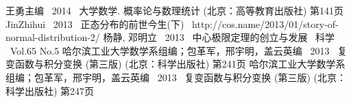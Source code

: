\documentclass[a4paper]{ctexart}
\begin{document}
\bigskip
\begin{thebibliography}{999}%

 王勇主编 \ 2014 \ 大学数学. 概率论与数理统计 (北京：高等教育出版社) 第141页
 JinZhihui \ 2013 \ 正态分布的前世今生(下) \ http://cos.name/2013/01/story-of-normal-distribution-2/
 杨静, 邓明立 \ 2013 \ 中心极限定理的创立与发展 \ 科学 \ Vol.65 No.5
 哈尔滨工业大学数学系组编；包革军，邢宇明，盖云英编 \ 2013 \ 复变函数与积分变换 (第三版) (北京：科学出版社) 第241页
 哈尔滨工业大学数学系组编；包革军，邢宇明，盖云英编 \ 2013 \ 复变函数与积分变换 (第三版) (北京：科学出版社) 第247页
\end{thebibliography} %
\end{document}
